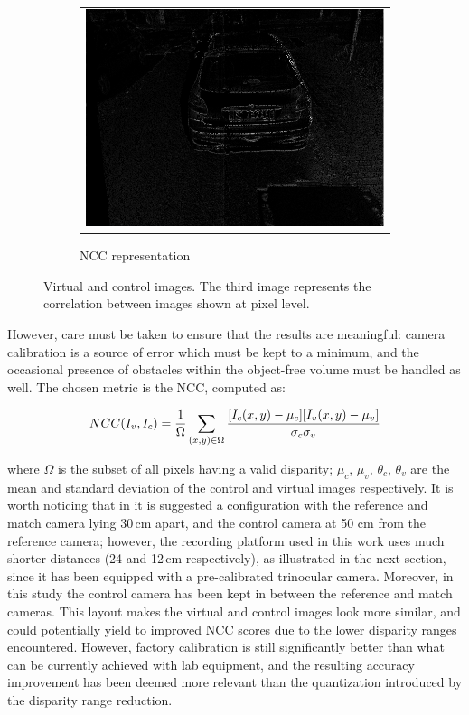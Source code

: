 \begin{figure}[h!]
        ~
        \begin{subfigure}[b]{0.3\textwidth}
	  \begin{tabular}{c}
	    \includegraphics[width=\textwidth]{ncc}
	  \end{tabular}
	  \caption{\ac{NCC} representation}\label{fig:cp03_ncc_comparison}
        \end{subfigure}%
        
        \caption{Virtual and control images. The third image represents the correlation between images shown at pixel level.}\label{fig:cp03_ncc}
\end{figure}

However, care must be taken to ensure that the results are meaningful: camera calibration is a source of error which must be kept to a minimum, and the occasional presence of obstacles within the object-free volume must be handled as well. The chosen metric is the \ac{NCC}, computed as:

\begin{equation}\label{eq:cp03_NCC}
NCC(I_v,I_c) = {{{1} \over {\Omega}}  \sum_{(x,y) \in \Omega} {{[I_c(x,y)-\mu_c][I_v(x,y)-\mu_v]} \over {\sigma_c \sigma_v}}}
\end{equation}

where $\Omega$ is the subset of all pixels having a valid disparity; $\mu_c$, $\mu_v$, $\theta_c$, $\theta_v$ are the mean and standard deviation of the control and virtual images respectively.
It is worth noticing that in \cite{Morales2011} it is suggested a configuration with the reference and match camera lying 30\,cm apart, and the control camera at 50 cm from the reference camera; however, the recording platform used in this work uses much shorter distances (24 and 12\,cm respectively), as illustrated in the next section, since it has been equipped with a pre-calibrated trinocular camera. Moreover, in this study the control camera has been kept in between the reference and match cameras. This layout makes the virtual and control images look more similar, and could potentially yield to improved NCC scores due to the lower disparity ranges encountered. However, factory calibration is still significantly better than what can be currently achieved with lab equipment, and the resulting
accuracy improvement has been deemed more relevant than the quantization introduced by the disparity range reduction.


